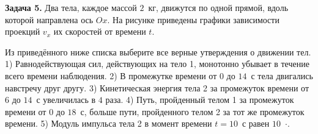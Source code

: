 

\begin{taskbasic}[code={\label{task:dem26_v5_n5}}]
\textbf{Задача 5.} Два тела, каждое массой $2$~кг, движутся по одной прямой, вдоль которой направлена ось $Ox$. На рисунке приведены графики зависимости проекций $v_x$ их скоростей от времени $t$. 

\nopagebreak\smallskip
\begin{center}
\end{center}

Из приведённого ниже списка выберите все верные утверждения о движении тел.
1) Равнодействующая сил, действующих на тело 1, монотонно убывает в течение всего времени наблюдения.
2) В промежутке времени от $0$ до $14$~с тела двигались навстречу друг другу.
3) Кинетическая энергия тела 2 за промежуток времени от $6$ до $14$~с увеличилась в $4$ раза.
4) Путь, пройденный телом 1 за промежуток времени от $0$ до $18$~с, больше пути, пройденного телом 2 за тот же промежуток времени.
5) Модуль импульса тела 2 в момент времени $t=10$~с равен $10$~$\cdot$.

\end{taskbasic}



